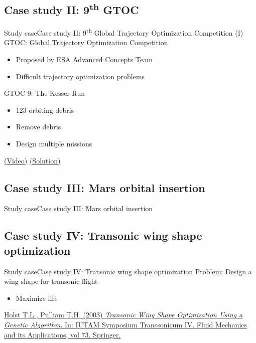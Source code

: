 \documentclass[10pt,compress]{beamer} %
\begin{document}
\subsection{Case study II: 9\textsuperscript{th} GTOC}
\begin{frame}{Study case}{Case study II: 9\textsuperscript{th} Global Trajectory Optimization Competition (I)}
    GTOC: Global Trajectory Optimization Competition
    \begin{itemize}
        \item Proposed by ESA Advanced Concepts Team
        \item Difficult trajectory optimization problems
    \end{itemize}

    GTOC 9: The Kesser Run
    \begin{itemize}
        \item 123 orbiting debris
        \item Remove debris
        \item Design multiple missions
    \end{itemize}
    \href{https://www.youtube.com/watch?v=zvxZx-QnqQ0}{(Video)}
    \href{https://www.youtube.com/watch?v=5CQNG6OIbZM}{(Solution)}
\end{frame}

\subsection{Case study III: Mars orbital insertion}
\begin{frame}{Study case}{Case study III: Mars orbital insertion}
    \setlength{\fboxrule}{0pt}
\end{frame}

\subsection{Case study IV: Transonic wing shape optimization}
\begin{frame}{Study case}{Case study IV: Transonic wing shape optimization}
    Problem: Design a wing shape for transonic flight
        \begin{itemize}
        \item Maximize lift
        \end{itemize}

    \setlength{\fboxrule}{0pt}
    \centering {} 
    
    \small
    \begin{flushleft}
    \href{https://link.springer.com/chapter/10.1007/978-94-010-0017-8\_38\#citeas}{Holst T.L., Pulliam T.H. (2003) \textit{Transonic Wing Shape Optimization Using a Genetic Algorithm}. In: IUTAM Symposium Transsonicum IV. Fluid Mechanics and its Applications, vol 73. Springer.}
    \end{flushleft}
\end{frame}
\end{document}
